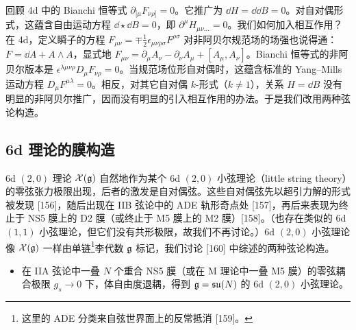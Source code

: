 回顾 4d 中的 Bianchi 恒等式 $\partial_{[\mu}F_{\nu\rho]}=0$。它推广为 $\dd H=\dd\dd B=0$。对自对偶形式，这蕴含自由运动方程 $\dd\star\dd B=0$，即 $\partial^\mu H_{\mu\nu\dots}=0$。我们如何加入相互作用？在 4d，定义瞬子的方程 $F_{\mu\nu}=\mp\frac{1}{2}\epsilon_{\mu\nu\rho\sigma}F^{\rho\sigma}$ 对非阿贝尔规范场的场强也说得通：$F=\dd A+A\wedge A$，显式地 $F_{\mu\nu}=\partial_\mu A_\nu-\partial_\nu A_\mu+[A_\mu,A_\nu]$。Bianchi 恒等式的非阿贝尔版本是 $\epsilon^{\lambda\mu\nu\rho}D_\mu F_{\nu\rho}=0$。当规范场位形自对偶时，这蕴含标准的 Yang--Mills 运动方程 $D_\mu F^{\mu\lambda}=0$。相反，对其它自对偶 $k$-形式（$k\ne 1$），关系 $H=\dd B$ 没有明显的非阿贝尔推广，因而没有明显的引入相互作用的办法。于是我们改用两种弦论构造。


\subsection{6d 理论的膜构造}

6d $(2,0)$ 理论 $\mathcal{X}(\mathfrak{g})$ 自然地作为某个 6d $(2,0)$ 小弦理论（little string theory）的零弦张力极限出现，后者的激发是自对偶弦。这些自对偶弦先以超引力解的形式被发现 [156]，随后出现在 IIB 弦论中的 ADE 轨形奇点处 [157]，再后来表现为终止于 NS5 膜上的 D2 膜（或终止于 M5 膜上的 M2 膜）[158]。（也存在类似的 6d $(1,1)$ 小弦理论，但它们没有共形极限，故我们不再讨论。）6d $(2,0)$ 小弦理论像 $\mathcal{X}(\mathfrak{g})$ 一样由单链\footnote{这里的 ADE 分类来自弦世界面上的反常抵消 [159]。}李代数 $\mathfrak{g}$ 标记，我们讨论 [160] 中综述的两种弦论构造。

\begin{itemize}[leftmargin=1.6em,itemsep=2pt,topsep=2pt]
\item 在 IIA 弦论中一叠 $N$ 个重合 NS5 膜（或在 M 理论中一叠 M5 膜）的零弦耦合极限 $g_s\to 0$ 下，体自由度退耦，得到 $\mathfrak{g}=\mathfrak{su}(N)$ 的 6d $(2,0)$ 小弦理论。
\end{itemize}
